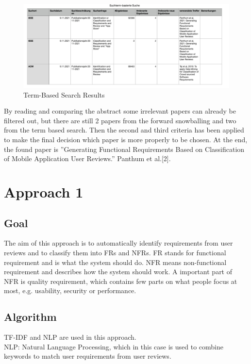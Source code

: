 \begin{figure}[H] 
\centering
\includegraphics[scale=0.5]{../images/Thema1_TermBasedSearch.png}
\caption{Term-Based Search Results}
\label{fig:model}
\end{figure}

By reading and comparing the abstract some irrelevant papers can already be filtered out, but there are still 2 papers from the forward snowballing and two from the term based search. Then the second and third criteria has been applied to make the final decision which paper is more properly to be chosen. At the end, the found paper is ”Generating Functional Requirements Based on Classification of Mobile Application User Reviews.” Panthum et al.[2]. 


\chapter{Approach 1}

\section{Goal}
The aim of this approach is to automatically identify requirements from user reviews and to classify them into FRs and NFRs. FR stands for functional requirement and is what the system should do. NFR means non-functional requirement and describes how the system should work. A important part of NFR is quality requirement, which contains few parts on what people focus at most, e.g. usability, security or performance.

\section{Algorithm}
TF-IDF and NLP are used in this approach.\\
NLP: Natural Language Processing, which in this case is used to combine keywords to match user requirements from user reviews.


